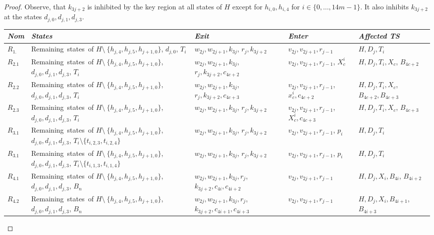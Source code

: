 \documentclass[english]{lipics_hacked}
\begin{document}
\begin{proof}
Observe, that $k_{3j+2}$ is inhibited by the key region at all states of $H$ except for $h_{i,0},h_{i,4}$ for $i\in \{0,\dots,14m-1\}$.
It also inhibits $k_{3j+2}$ at the states $d_{j,0},d_{j,1},d_{j,3}$.
%
\begin{longtable}{p{0.9cm} p{3cm}   p{2.5cm}    p{2.5cm}      p{2.7cm}  }
\textit{Nom} &\textit{States} & \textit{Exit} & \textit{Enter} & \textit{Affected TS}  \\ \hline
$R_{1.}$ & Remaining~states~of $H\setminus~\{h_{j,4},h_{j,5},h_{j+1,0}\}$, $d_{j,0}$, $T_i$& $w_{2j},w_{2j+1},k_{3j}$, $r_{j},k_{3j+2}$ & $v_{2j},v_{2j+1},r_{j-1}$ & $H,D_j, T_i$\\
%
 $R_{2.1}$ & Remaining~states~of $H\setminus~\{h_{j,4},h_{j,5},h_{j+1,0}\}$, $d_{j,0},d_{j,1},d_{j,3}$, $T_i$& $w_{2j},w_{2j+1},k_{3j}$, $r_{j},k_{3j+2},c_{4c+2}$ & $v_{2j},v_{2j+1},r_{j-1}$, $X^{i}_c$ & $H,D_j, T_i, X_c$, $B_{4c+2}$\\
 $R_{2.2}$ & Remaining~states~of $H\setminus~\{h_{j,4},h_{j,5},h_{j+1,0}\}$, $d_{j,0},d_{j,1},d_{j,3}$, $T_i$& $w_{2j},w_{2j+1},k_{3j}$, $r_{j},k_{3j+2},c_{4c+3}$ & $v_{2j},v_{2j+1},r_{j-1}$, $x^{i}_c,c_{4c+2}$ & $H,D_j, T_i, X_c$, $B_{4c+2},B_{4c+3}$\\
 $R_{2.3}$ & Remaining~states~of $H\setminus~\{h_{j,4},h_{j,5},h_{j+1,0}\}$, $d_{j,0},d_{j,1},d_{j,3}$, $T_i$& $w_{2j},w_{2j+1},k_{3j}$, $r_{j},k_{3j+2}$ & $v_{2j},v_{2j+1},r_{j-1}$, $X^{i}_c,c_{4c+3}$ & $H,D_j, T_i, X_c$, $B_{4c+3}$\\
 $R_{3.1}$ & Remaining~states~of $H\setminus~\{h_{j,4},h_{j,5},h_{j+1,0}\}$, $d_{j,0},d_{j,1},d_{j,3}$,  $T_i\setminus \{t_{i,2,3},t_{i,2,4}\}$& $w_{2j},w_{2j+1},k_{3j}$, $r_{j},k_{3j+2}$ & $v_{2j},v_{2j+1},r_{j-1}$, $p_i$ & $H,D_j, T_i$\\
 $R_{3.1}$ & Remaining~states~of $H\setminus~\{h_{j,4},h_{j,5},h_{j+1,0}\}$, $d_{j,0},d_{j,1},d_{j,3}$,  $T_i\setminus \{t_{i,1,3},t_{i,1,4}\}$& $w_{2j},w_{2j+1},k_{3j}$, $r_{j},k_{3j+2}$ & $v_{2j},v_{2j+1},r_{j-1}$, $p_i$ & $H,D_j, T_i$\\
  $R_{4.1}$ & Remaining~states~of $H\setminus~\{h_{j,4},h_{j,5},h_{j+1,0}\}$, $d_{j,0},d_{j,1},d_{j,3}$, $B_{n}$ & $w_{2j},w_{2j+1},k_{3j},r_j$, $k_{3j+2},c_{4i},c_{4i+2}$ & $v_{2j},v_{2j+1},r_{j-1}$ & $H,D_j,X_i,B_{4i}$, $B_{4i+2}$\\
  $R_{4.2}$ & Remaining~states~of $H\setminus~\{h_{j,4},h_{j,5},h_{j+1,0}\}$, $d_{j,0},d_{j,1},d_{j,3}$, $B_{n}$ & $w_{2j},w_{2j+1},k_{3j},r_j$, $k_{3j+2},c_{4i+1},c_{4i+3}$ & $v_{2j},v_{2j+1},r_{j-1}$ & $H,D_j,X_i,B_{4i+1}$, $B_{4i+3}$\\

\end{longtable}
\end{proof}
\end{document}

